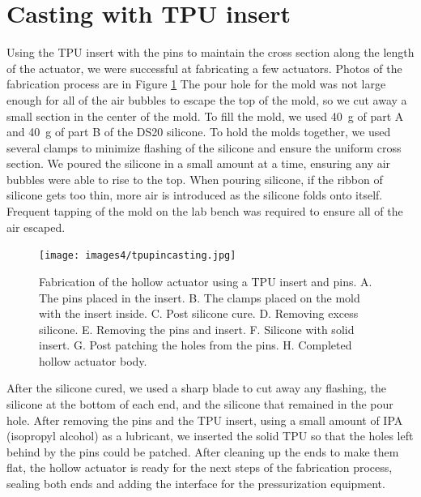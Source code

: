 \section{Casting with TPU insert}
Using the TPU insert with the pins to maintain the cross section along the length of the actuator, we were successful at fabricating a few actuators. Photos of the fabrication process are in Figure \ref{fig:tpupinfab} The pour hole for the mold was not large enough for all of the air bubbles to escape the top of the mold, so we cut away a small section in the center of the mold. To fill the mold, we used 40~g of part A and 40~g of part B of the DS20 silicone. To hold the molds together, we used several clamps to minimize flashing of the silicone and ensure the uniform cross section. We poured the silicone in a small amount at a time, ensuring any air bubbles were able to rise to the top. When pouring silicone, if the ribbon of silicone gets too thin, more air is introduced as the silicone folds onto itself. Frequent tapping of the mold on the lab bench was required to ensure all of the air escaped. 

\begin{figure}[h]
    \centering
    \texttt{[image: images4/tpupincasting.jpg]}
    \caption{Fabrication of the hollow actuator using a TPU insert and pins. A. The pins placed in the insert. B. The clamps placed on the mold with the insert inside. C. Post silicone cure. D. Removing excess silicone. E. Removing the pins and insert. F. Silicone with solid insert. G. Post patching the holes from the pins. H. Completed hollow actuator body.}
    \label{fig:tpupinfab}
\end{figure}

After the silicone cured, we used a sharp blade to cut away any flashing, the silicone at the bottom of each end, and the silicone that remained in the pour hole. After removing the pins and the TPU insert, using a small amount of IPA (isopropyl alcohol) as a lubricant, we inserted the solid TPU so that the holes left behind by the pins could be patched. After cleaning up the ends to make them flat, the hollow actuator is ready for the next steps of the fabrication process, sealing both ends and adding the interface for the pressurization equipment. 

